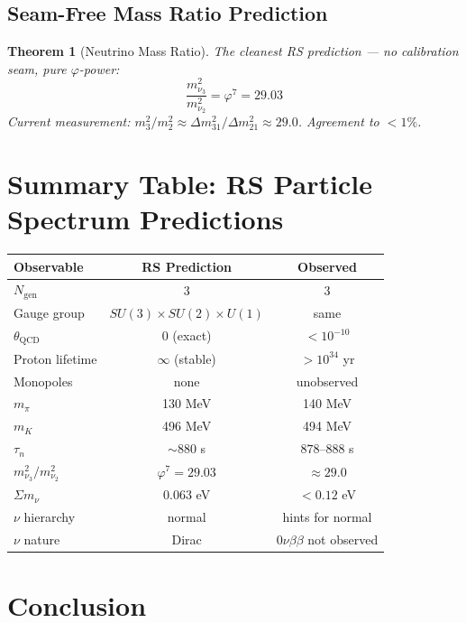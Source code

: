 \documentclass[12pt,a4paper]{article}
\newtheorem{theorem}{Theorem}[section]
\theoremstyle{definition}
\theoremstyle{remark}
\begin{document}
\subsection{Seam-Free Mass Ratio Prediction}

\begin{theorem}[Neutrino Mass Ratio]
The cleanest RS prediction --- no calibration seam, pure $\varphi$-power:
\begin{equation}
\frac{m_{\nu_3}^2}{m_{\nu_2}^2} = \varphi^7 = 29.03
\end{equation}
Current measurement: $m_3^2/m_2^2 \approx \Delta m^2_{31}/\Delta m^2_{21} \approx 29.0$.
Agreement to $< 1\%$.
\end{theorem}

\section{Summary Table: RS Particle Spectrum Predictions}

\begin{center}
\begin{tabular}{|l|c|c|}
\hline
\textbf{Observable} & \textbf{RS Prediction} & \textbf{Observed} \\
\hline
$N_\mathrm{gen}$ & 3 & 3 \\
Gauge group & $SU(3)\times SU(2)\times U(1)$ & same \\
$\theta_\mathrm{QCD}$ & 0 (exact) & $< 10^{-10}$ \\
Proton lifetime & $\infty$ (stable) & $> 10^{34}$ yr \\
Monopoles & none & unobserved \\
$m_\pi$ & 130 MeV & 140 MeV \\
$m_K$ & 496 MeV & 494 MeV \\
$\tau_n$ & $\sim 880$ s & $878$–$888$ s \\
$m_{\nu_3}^2/m_{\nu_2}^2$ & $\varphi^7 = 29.03$ & $\approx 29.0$ \\
$\Sigma m_\nu$ & 0.063 eV & $< 0.12$ eV \\
$\nu$ hierarchy & normal & hints for normal \\
$\nu$ nature & Dirac & $0\nu\beta\beta$ not observed \\
\hline
\end{tabular}
\end{center}

\section{Conclusion}
\end{document}
